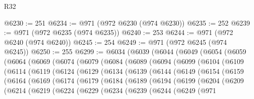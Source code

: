 \begin{lexlean}{R32}
\begin{coremodule}
@6230 := 251
@6234 := @971 (@972 @6230 (@974 @6230))
@6235 := 252
@6239 := @971 (@972 @6235 (@974 @6235))
@6240 := 253
@6244 := @971 (@972 @6240 (@974 @6240))
@6245 := 254
@6249 := @971 (@972 @6245 (@974 @6245))
@6250 := 255
@6299 := @6034
    (@6039
      (@6044
        (@6049
          (@6054
            (@6059
              (@6064
                (@6069
                  (@6074
                    (@6079
                      (@6084
                        (@6089
                          (@6094
                            (@6099
                              (@6104
                                (@6109
                                  (@6114
                                    (@6119
                                      (@6124
                                        (@6129
                                          (@6134
                                            (@6139
                                              (@6144
                                                (@6149
                                                  (@6154
                                                    (@6159
                                                      (@6164
                                                        (@6169
                                                          (@6174
                                                            (@6179
                                                              (@6184
                                                                (@6189
                                                                  (@6194
                                                                    (@6199
                                                                      (@6204
                                                                        (@6209
                                                                          (@6214
                                                                            (@6219
                                                                              (@6224
                                                                                (@6229
                                                                                  (@6234
                                                                                    (@6239
                                                                                      (@6244
                                                                                        (@6249
                                                                                          (@971

\end{coremodule}
\end{lexlean}
